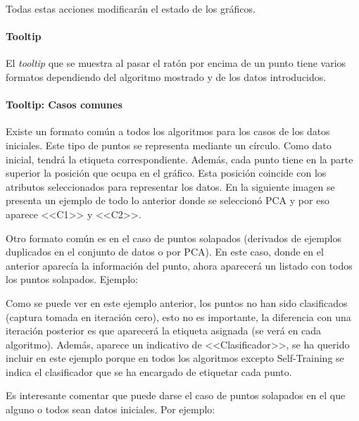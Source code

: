 Todas estas acciones modificarán el estado de los gráficos.

\paragraph{Tooltip} El \textit{tooltip} que se muestra al pasar el ratón por
encima de un punto tiene varios formatos dependiendo del algoritmo mostrado y de
los datos introducidos.

\paragraph{Tooltip: Casos comunes}

Existe un formato común a todos los algoritmos para los casos de los datos
iniciales. Este tipo de puntos se representa mediante un círculo. Como dato
inicial, tendrá la etiqueta correspondiente. Además, cada punto tiene en la
parte superior la posición que ocupa en el gráfico. Esta posición coincide con
los atributos seleccionados para representar los datos. En la siguiente imagen
se presenta un ejemplo de todo lo anterior donde se seleccionó PCA y por eso
aparece <<C1>> y <<C2>>.


Otro formato común es en el caso de puntos solapados (derivados de ejemplos
duplicados en el conjunto de datos o por PCA). En este caso, donde en el anterior
aparecía la información del punto, ahora aparecerá un listado con todos los
puntos solapados. Ejemplo:


Como se puede ver en este ejemplo anterior, los puntos no han sido clasificados
(captura tomada en iteración cero), esto no es importante, la diferencia con una
iteración posterior es que aparecerá la etiqueta asignada (se verá en cada
algoritmo). Además, aparece un indicativo de <<Clasificador>>, se ha querido
incluir en este ejemplo porque en todos los algoritmos excepto Self-Training se
indica el clasificador que se ha encargado de etiquetar cada punto.

Es interesante comentar que puede darse el caso de puntos solapados en el que
alguno o todos sean datos iniciales. Por ejemplo:


